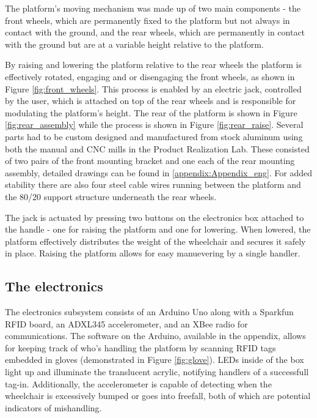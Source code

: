 The platform's moving mechanism was made up of two main components - the front wheels, which are permanently fixed to the platform but not always in contact with the ground, and the rear wheels, which are permanently in contact with the ground but are at a variable height relative to the platform.

By raising and lowering the platform relative to the rear wheels the platform is effectively rotated, engaging and or disengaging the front wheels, as shown in Figure \ref{fig:front_wheels}. This process is enabled by an electric jack, controlled by the user, which is attached on top of the rear wheels and is responsible for modulating the platform's height. The rear of the platform is shown in Figure \ref{fig:rear_assembly} while the process is shown in Figure \ref{fig:rear_raise}. Several parts had to be custom designed and manufactured from stock aluminum using both the manual and CNC mills in the Product Realization Lab. These consisted of two pairs of the front mounting bracket and one each of the rear mounting assembly, detailed drawings can be found in \ref{appendix:Appendix_eng}. For added stability there are also four steel cable wires running between the platform and the 80/20 support structure underneath the rear wheels.

The jack is actuated by pressing two buttons on the electronics box attached to the handle - one for raising the platform and one for lowering. When lowered, the platform effectively distributes the weight of the wheelchair and secures it safely in place. Raising the platform allows for easy manuevering by a single handler.



\subsection{The electronics}

The electronics subsystem consists of an Arduino Uno along with a Sparkfun RFID board, an ADXL345 accelerometer, and an XBee radio for communications. The software on the Arduino, available in the appendix, allows for keeping track of who's handling the platform by scanning RFID tags embedded in gloves (demonstrated in Figure \ref{fig:glove}). LEDs inside of the box light up and illuminate the translucent acrylic, notifying handlers of a successfull tag-in. Additionally, the accelerometer is capable of detecting when the wheelchair is excessively bumped or goes into freefall, both of which are potential indicators of mishandling.

